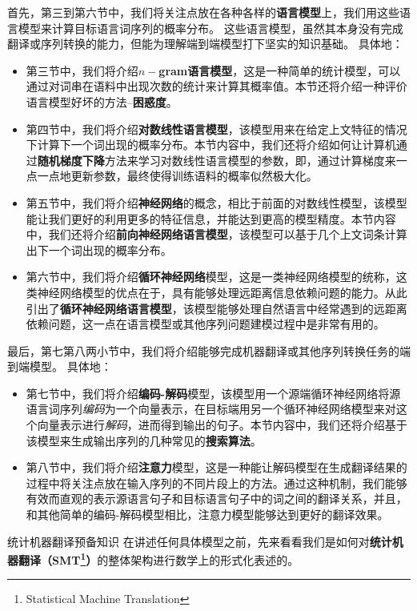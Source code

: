 \documentclass[10pt,a4paper]{ctexart}
\makeatletter
\renewcommand{\section}{\@startsection{section}{1}{0mm}
  {-\baselineskip}{0.5\baselineskip}{\bf\leftline}}
\makeatother
\begin{document}
首先，第三到第六节中，我们将关注点放在各种各样的\textbf{语言模型}上，我们用这些语言模型来计算目标语言词序列的概率分布。
这些语言模型，虽然其本身没有完成翻译或序列转换的能力，但能为理解端到端模型打下坚实的知识基础。
具体地：
\begin{itemize}
\item 第三节中，我们将介绍$n-$\textbf{gram语言模型}，这是一种简单的统计模型，可以通过对词串在语料中出现次数的统计来计算其概率值。本节还将介绍一种评价语言模型好坏的方法--\textbf{困惑度}。
\item 第四节中，我们将介绍\textbf{对数线性语言模型}，该模型用来在给定上文特征的情况下计算下一个词出现的概率分布。本节内容中，我们还将介绍如何让计算机通过\textbf{随机梯度下降}方法来学习对数线性语言模型的参数，即，通过计算梯度来一点一点地更新参数，最终使得训练语料的概率似然极大化。
\item 第五节中，我们将介绍\textbf{神经网络}的概念，相比于前面的对数线性模型，该模型能让我们更好的利用更多的特征信息，并能达到更高的模型精度。本节内容中，我们还将介绍\textbf{前向神经网络语言模型}，该模型可以基于几个上文词条计算出下一个词出现的概率分布。
\item 第六节中，我们将介绍\textbf{循环神经网络}模型，这是一类神经网络模型的统称，这类神经网络模型的优点在于，具有能够处理远距离信息依赖问题的能力。从此引出了\textbf{循环神经网络语言模型}，该模型能够处理自然语言中经常遇到的远距离依赖问题，这一点在语言模型或其他序列问题建模过程中是非常有用的。
\end{itemize}

最后，第七第八两小节中，我们将介绍能够完成机器翻译或其他序列转换任务的端到端模型。
具体地：
\begin{itemize}
\item 第七节中，我们将介绍\textbf{编码-解码}模型，该模型用一个源端循环神经网络将源语言词序列\textit{编码}为一个向量表示，在目标端用另一个循环神经网络模型来对这个向量表示进行\textit{解码}，进而得到输出的句子。本节内容中，我们还将介绍基于该模型来生成输出序列的几种常见的\textbf{搜索算法}。
\item 第八节中，我们将介绍\textbf{注意力}模型，这是一种能让解码模型在生成翻译结果的过程中将关注点放在输入序列的不同片段上的方法。通过这种机制，我们能够有效而直观的表示源语言句子和目标语言句子中的词之间的翻译关系，并且，和其他简单的编码-解码模型相比，注意力模型能够达到更好的翻译效果。
\end{itemize}

\newpage

\section{统计机器翻译预备知识}
在讲述任何具体模型之前，先来看看我们是如何对\textbf{统计机器翻译（SMT\footnote{Statistical Machine Translation}）}\cite{brown1993mathematics}的整体架构进行数学上的形式化表述的。
\end{document}
